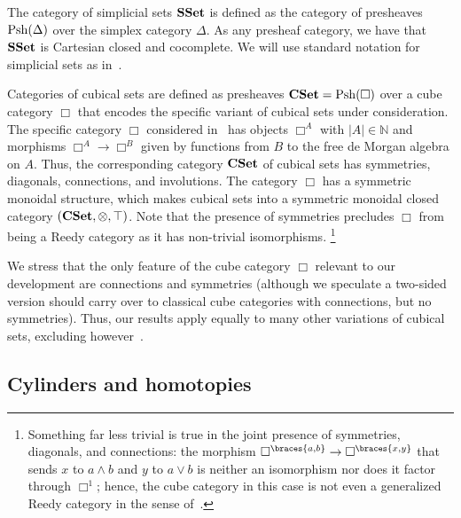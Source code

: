 \documentclass[reqno,10pt,a4paper,oneside,draft]{amsart}
\begin{document}
\begin{example}
The category of simplicial sets $\mathbf{SSet}$ is defined as the category of presheaves $\mathrm{Psh}(\Delta)$ over the simplex category $\Delta$.
As any presheaf category, we have that $\mathbf{SSet}$ is Cartesian closed and cocomplete.
We will use standard notation for simplicial sets as in~\cite{goerss-jardine}.
\end{example}

\begin{example}
Categories of cubical sets are defined as presheaves $\mathbf{CSet} = \mathrm{Psh}(\Box)$ over a cube category $\Box$ that encodes the specific variant of cubical sets under consideration.
The specific category $\Box$ considered in~\cite{cohen-et-al:cubicaltt} has objects $\Box^A$ with $|A| \in \mathbb{N}$ and morphisms $\Box^A \to \Box^B$ given by functions from $B$ to the free de Morgan algebra on $A$.
Thus, the corresponding category $\mathbf{CSet}$ of cubical sets has symmetries, diagonals, connections, and involutions.
The category $\Box$ has a symmetric monoidal structure, which makes cubical sets into a symmetric monoidal closed category $(\mathbf{CSet}, \otimes, \top)$.
Note that the presence of symmetries precludes $\Box$ from being a Reedy category as it has non-trivial isomorphisms.%
\footnote{
Something far less trivial is true in the joint presence of symmetries, diagonals, and connections: the morphism $\Box^{\braces{a, b}} \to \Box^{\braces{x, y}}$ that sends $x$ to $a \wedge b$ and $y$ to $a \vee b$ is neither an isomorphism nor does it factor through $\Box^1$; hence, the cube category in this case is not even a generalized Reedy category in the sense of~\cite{berger-moerdijk:generalized-reedy}.
}
\end{example}

We stress that the only feature of the cube category $\Box$ relevant to our development are connections and symmetries (although we speculate a two-sided version should carry over to classical cube categories with connections, but no symmetries).
Thus, our results apply equally to many other variations of cubical sets, excluding however~\cite{coquand-cubical-sets,huber-thesis}.

\subsection*{Cylinders and homotopies}
\end{document}
